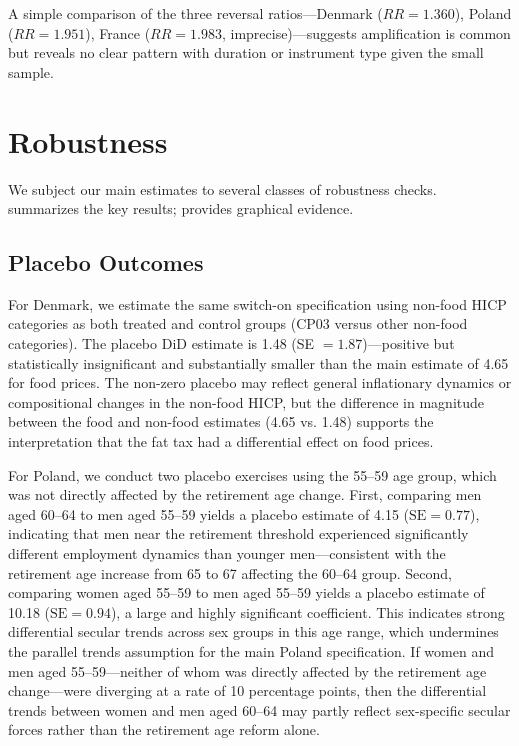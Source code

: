 \documentclass[12pt]{article}
\begin{document}
A simple comparison of the three reversal ratios---Denmark ($RR = 1.360$), Poland ($RR = 1.951$), France ($RR = 1.983$, imprecise)---suggests amplification is common but reveals no clear pattern with duration or instrument type given the small sample.


\section{Robustness}
\label{sec:robustness}

We subject our main estimates to several classes of robustness checks.  summarizes the key results;  provides graphical evidence.

\subsection{Placebo Outcomes}

For Denmark, we estimate the same switch-on specification using non-food HICP categories as both treated and control groups (CP03 versus other non-food categories). The placebo DiD estimate is 1.48 (SE $= 1.87$)---positive but statistically insignificant and substantially smaller than the main estimate of 4.65 for food prices. The non-zero placebo may reflect general inflationary dynamics or compositional changes in the non-food HICP, but the difference in magnitude between the food and non-food estimates (4.65 vs. 1.48) supports the interpretation that the fat tax had a differential effect on food prices.

For Poland, we conduct two placebo exercises using the 55--59 age group, which was not directly affected by the retirement age change. First, comparing men aged 60--64 to men aged 55--59 yields a placebo estimate of 4.15 ($\text{SE} = 0.77$), indicating that men near the retirement threshold experienced significantly different employment dynamics than younger men---consistent with the retirement age increase from 65 to 67 affecting the 60--64 group. Second, comparing women aged 55--59 to men aged 55--59 yields a placebo estimate of 10.18 ($\text{SE} = 0.94$), a large and highly significant coefficient. This indicates strong differential secular trends across sex groups in this age range, which undermines the parallel trends assumption for the main Poland specification. If women and men aged 55--59---neither of whom was directly affected by the retirement age change---were diverging at a rate of 10 percentage points, then the differential trends between women and men aged 60--64 may partly reflect sex-specific secular forces rather than the retirement age reform alone.
\end{document}
